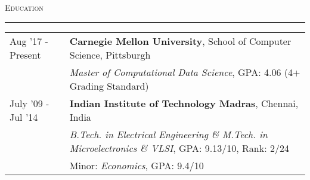 \documentclass[8pt,a4paper,English]{article}
\newcommand{\lv}{\color{table-border}\vrule}
\newcommand\roottitle[1]{ \vspace{3mm} \noindent \textsc{ \normalsize #1} \vspace{1.5mm} \nopagebreak[4] \color{gray} \hrule \color{black} \vspace{2mm} \noindent \small }
\begin{document}

\roottitle{Education}
\renewcommand{\arraystretch}{1.2}
\setlength\tabcolsep{8pt}
\begin{tabularx}{\textwidth}{R{2.6cm} !{\lv} X}
  Aug '17 - Present  	& \textbf{Carnegie Mellon University}, School of Computer Science, Pittsburgh\\
						& \textit{Master of Computational Data Science}, GPA: 4.06 (4+ Grading Standard) \\
  July '09 - Jul '14    & \textbf{Indian Institute of Technology Madras}, Chennai, India \\
                        & \textit{B.Tech. in Electrical Engineering \& M.Tech. in Microelectronics \& VLSI}, GPA: 9.13/10, Rank: 2/24\\
                        & Minor: \textit{Economics}, GPA: 9.4/10 \\
\end{tabularx}

\end{document}
